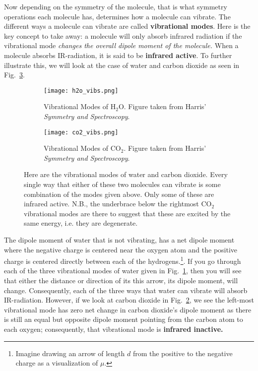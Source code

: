     Now depending on the symmetry of the molecule, that is what symmetry operations each molecule has, determines how a molecule can vibrate. The different ways a molecule can vibrate are called \textbf{vibrational modes}. Here is the key concept to take away: a molecule will only absorb infrared radiation if the vibrational mode \emph{changes the overall dipole moment of the molecule.}\cite{harris1978symmetry,atkins2014physical,bishop1993group} When a molecule absorbs IR-radiation, it is said to be \textbf{infrared active}. To further illustrate this, we will look at the case of water and carbon dioxide as seen in Fig.~\ref{fig:vib_modes}. 

    \begin{figure}[hb]
     \begin{center}
        \begin{subfigure}[b]{0.6\textwidth}
            \texttt{[image: h2o\_vibs.png]}
            \caption{Vibrational Modes of H$_2$O. Figure taken from Harris' \emph{Symmetry and Spectroscopy}.\cite{harris1978symmetry}}
            \label{fig:h2o_vibs}         
        \end{subfigure}
        \begin{subfigure}[b]{0.6\textwidth}
            \texttt{[image: co2\_vibs.png]}
            \caption{Vibrational Modes of CO$_2$. Figure taken from Harris' \emph{Symmetry and Spectroscopy}.\cite{harris1978symmetry}}
            \label{fig:co2_vibs}         
        \end{subfigure}
        \caption{Here are the vibrational modes of water and carbon dioxide. Every single way that either of these two molecules can vibrate is some combination of the modes given above. Only some of these are infrared active.\cite{harris1978symmetry} N.B., the underbrace below the rightmost CO$_2$ vibrational modes are there to suggest that these are excited by the same energy, i.e. they are degenerate.}
        \label{fig:vib_modes}
     \end{center}
    \end{figure}    

    The dipole moment of water that is not vibrating, has a net dipole moment where the negative charge is centered near the oxygen atom and the positive charge is centered directly between each of the hydrogens.\footnote{
        Imagine drawing an arrow of length $d$ from the positive to the negative charge as a visualization of $\mu.$
        }. 
    If you go through each of the three vibrational modes of water given in Fig.~\ref{fig:h2o_vibs}, then you will see that either the distance or direction of its this arrow, its dipole moment, will change. Consequently, each of the three ways that water can vibrate will absorb IR-radiation. However, if we look at carbon dioxide in Fig.~\ref{fig:co2_vibs}, we see the left-most vibrational mode has zero net change in carbon dioxide's dipole moment as there is still an equal but opposite dipole moment pointing from the carbon atom to each oxygen; consequently, that vibrational mode is \textbf{infrared inactive.}


